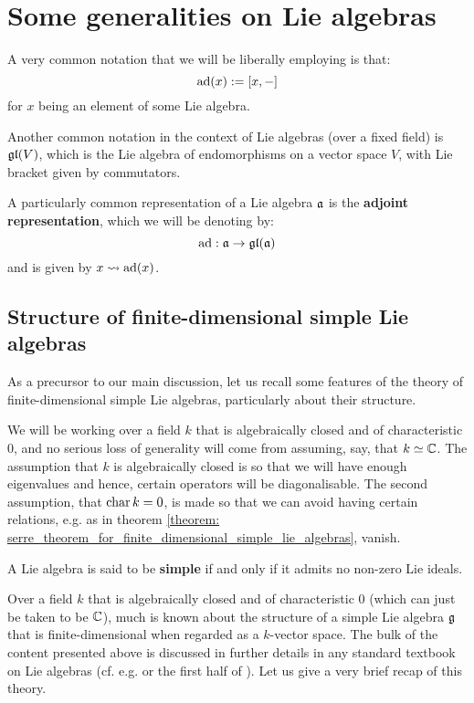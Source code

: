 \section{Some generalities on Lie algebras}
    \begin{convention}
        A very common notation that we will be liberally employing is that:
            $$\mathrm{ad}(x) := [x, -]$$
        for $x$ being an element of some Lie algebra. 

        Another common notation in the context of Lie algebras (over a fixed field) is $\mathfrak{gl}(V)$, which is the Lie algebra of endomorphisms on a vector space $V$, with Lie bracket given by commutators.

        A particularly common representation of a Lie algebra $\mathfrak{a}$ is the \textbf{adjoint representation}, which we will be denoting by:
            $$\mathrm{ad}: \mathfrak{a} \to \mathfrak{gl}(\mathfrak{a})$$
        and is given by $x \leadsto \mathrm{ad}(x)$.
    \end{convention}

    \subsection{Structure of finite-dimensional simple Lie algebras} \label{subsection: finite_dimensional_simple_lie_algebras}
        As a precursor to our main discussion, let us recall some features of the theory of finite-dimensional simple Lie algebras, particularly about their structure.

        We will be working over a field $k$ that is algebraically closed and of characteristic $0$, and no serious loss of generality will come from assuming, say, that $k \simeq \mathbb{C}$. The assumption that $k$ is algebraically closed is so that we will have enough eigenvalues and hence, certain operators will be diagonalisable. The second assumption, that $\operatorname{char} k = 0$, is made so that we can avoid having certain relations, e.g. as in theorem \ref{theorem: serre_theorem_for_finite_dimensional_simple_lie_algebras}, vanish.

        \begin{definition}
            A Lie algebra is said to be \textbf{simple} if and only if it admits no non-zero Lie ideals. 
        \end{definition}

        Over a field $k$ that is algebraically closed and of characteristic $0$ (which can just be taken to be $\mathbb{C}$), much is known about the structure of a simple Lie algebra $\mathfrak{g}$ that is finite-dimensional when regarded as a $k$-vector space. The bulk of the content presented above is discussed in further details in any standard textbook on Lie algebras (cf. e.g. \cite{humphreys_lie_algebras} or the first half of \cite{carter_affine_lie_algebras}). Let us give a very brief recap of this theory.

